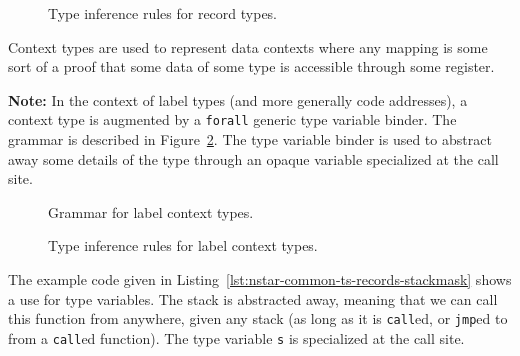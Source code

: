 \begin{figure}[htb]
	\centering


	\caption{Type inference rules for record types.}
	\label{fig:nstar-common-ts-records-typerules}
\end{figure}

Context types are used to represent data contexts where any mapping is some sort of a proof that some data of some type is accessible through some register.

\vspace{\baselineskip}

\textbf{Note:} In the context of label types (and more generally code addresses), a context type is augmented by a \texttt{forall} generic type variable binder.
The grammar is described in Figure~\ref{fig:nstar-common-ts-label-types-syntax}.
The type variable binder is used to abstract away some details of the type through an opaque variable specialized at the call site.

\begin{figure}[htb]
	\centering
	\caption{Grammar for label context types.}
	\label{fig:nstar-common-ts-label-types-syntax}
\end{figure}

\begin{figure}[htb]
	\centering


	\caption{Type inference rules for label context types.}
	\label{fig:nstar-common-ts-label-types-typerules}
\end{figure}

The example code given in Listing~\ref{lst:nstar-common-ts-records-stackmask} shows a use for type variables.
The stack is abstracted away, meaning that we can call this function from anywhere, given any stack (as long as it is \texttt{call}ed, or \texttt{jmp}ed to from a \texttt{call}ed function).
The type variable \texttt{s} is specialized at the call site.

